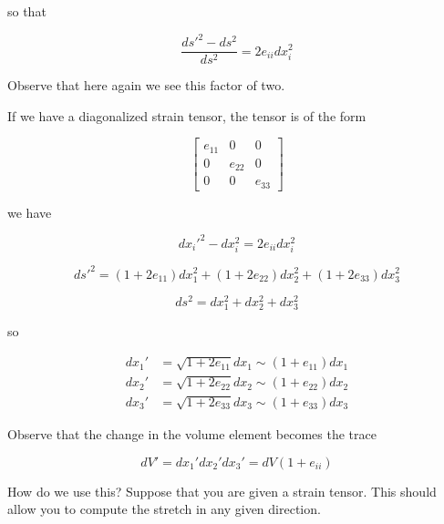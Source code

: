 so that

\begin{equation}\label{eqn:continuumL3:90}
\frac{
{ds'}^2 - ds^2 
}{ds^2}
= 2 e_{ii} dx_i^2
\end{equation}

Observe that here again we see this factor of two.

If we have a diagonalized strain tensor, the tensor is of the form

\begin{equation}\label{eqn:continuumL3:110}
\begin{bmatrix}
e_{11} & 0 & 0 \\
0 & e_{22} & 0 \\
0 & 0 & e_{33} 
\end{bmatrix}
\end{equation}

we have

\begin{equation}\label{eqn:continuumL3:130}
{dx_i'}^2 - dx_i^2 = 2 e_{ii} dx_i^2
\end{equation}

\begin{equation}\label{eqn:continuumL3:150}
{ds'}^2 = 
(1 + 2 e_{11}) dx_1^2
+(1 + 2 e_{22}) dx_2^2
+(1 + 2 e_{33}) dx_3^2
\end{equation}

\begin{equation}\label{eqn:continuumL3:170}
ds^2 = 
dx_1^2
+dx_2^2
+dx_3^2
\end{equation}

so 

\begin{align}\label{eqn:continuumL3:190}
dx_1' &= \sqrt{1 + 2 e_{11}} dx_1 \sim ( 1 + e_{11}) dx_1 \\
dx_2' &= \sqrt{1 + 2 e_{22}} dx_2 \sim ( 1 + e_{22}) dx_2 \\
dx_3' &= \sqrt{1 + 2 e_{33}} dx_3 \sim ( 1 + e_{33}) dx_3
\end{align}

Observe that the change in the volume element becomes the trace

\begin{equation}\label{eqn:continuumL3:210}
dV' = 
dx_1'
dx_2'
dx_3'
= dV(1 + e_{ii})
\end{equation}

How do we use this?  Suppose that you are given a strain tensor.  This should allow you to compute the stretch in any given direction.

